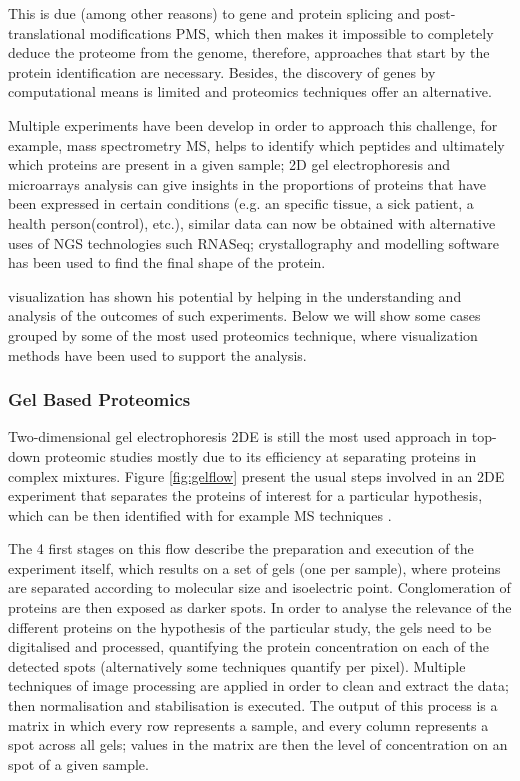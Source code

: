 This is due (among other reasons) to gene and protein splicing and post-translational modifications PMS, which then makes it impossible to completely deduce the proteome from the genome, therefore, approaches that start by the protein identification are necessary. Besides, the discovery of genes by computational means is limited and proteomics techniques offer an alternative.

Multiple experiments have been develop in order to approach this challenge, for example, mass spectrometry MS, helps to identify which peptides and ultimately which proteins are present in a given sample; 2D gel electrophoresis and microarrays analysis can give insights in the proportions of proteins that have been expressed in certain conditions (e.g. an specific tissue, a sick patient, a health person(control), etc.), similar data can now be obtained with alternative uses of NGS technologies such RNASeq; crystallography and modelling software has been used to find the final shape of the protein.

visualization has shown his potential by helping in the understanding and analysis of the outcomes of such experiments. Below we will show some cases grouped by some of the most used proteomics technique, where visualization methods have been used to support the analysis.

\subsubsection{Gel Based Proteomics}
Two-dimensional gel electrophoresis 2DE is still the most used approach in top-down proteomic studies mostly due to its efficiency at separating proteins in complex mixtures. Figure \ref{fig:gelflow} present the usual steps involved in an 2DE experiment that separates the proteins of interest for a particular hypothesis, which can be then identified with for example MS techniques \cite{SIL2014}.

The 4 first stages on this flow describe the preparation and execution of the experiment itself, which results on a set of gels (one per sample), where proteins are separated according to molecular size and isoelectric point. Conglomeration of proteins are then exposed as darker spots. In order to analyse the relevance of the different proteins on the hypothesis of the particular study, the gels need to be digitalised and processed, quantifying the protein concentration on each of the detected spots (alternatively some techniques quantify per pixel). Multiple techniques of image processing are applied in order to clean and extract the data; then normalisation and stabilisation is executed. The output of this process is a matrix in which every row represents a sample, and every column represents a spot across all gels; values in the matrix are then the level of concentration on an spot of a given sample. 

